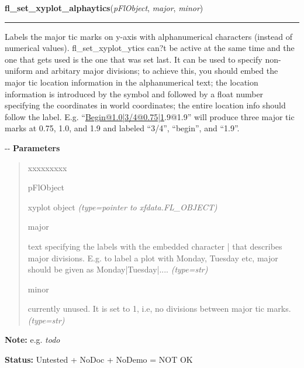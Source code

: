     \label{xformslib:flxyplot:fl_set_xyplot_alphaytics}

    \vspace{0.5ex}

\hspace{.8\funcindent}\begin{boxedminipage}{\funcwidth}

    \raggedright \textbf{fl\_set\_xyplot\_alphaytics}(\textit{pFlObject}, \textit{major}, \textit{minor})

    \vspace{-1.5ex}

    \rule{\textwidth}{0.5\fboxrule}
\setlength{\parskip}{2ex}

Labels the major tic marks on y-axis with alphanumerical characters
(instead of numerical values). fl\_set\_xyplot\_ytics can?t be active at the
same time and the one that gets used is the one that was set last. It can
be used to specify non-uniform and arbitary major divisions; to achieve
this, you should embed the major tic location information in the
alphanumerical text; the location information is introduced by the symbol
and followed by a float number specifying the coordinates in world
coordinates; the entire location info should follow the label. E.g.
``\href{mailto:Begin@1.0|3}{Begin@1.0|3}\href{mailto:/4@0.75|1}{/4@0.75|1}.9@1.9'' will produce three major tic marks at 0.75,
1.0, and 1.9 and labeled ``3/4'', ``begin'', and ``1.9''.

-{}-
\setlength{\parskip}{1ex}
      \textbf{Parameters}
      \vspace{-1ex}

      \begin{quote}
        \begin{Ventry}{xxxxxxxxx}

          \item[pFlObject]


xyplot object
            {\it (type=pointer to xfdata.FL\_OBJECT)}

          \item[major]


text specifying the labels with the embedded character | that
describes major divisions. E.g. to label a plot with Monday, Tuesday
etc, major should be given as Monday|Tuesday|....
            {\it (type=str)}

          \item[minor]


currently unused. It is set to 1, i.e, no divisions between major tic
marks.
            {\it (type=str)}

        \end{Ventry}

      \end{quote}

\textbf{Note:} 
e.g. \emph{todo}


\textbf{Status:} 
Untested + NoDoc + NoDemo = NOT OK


    \end{boxedminipage}


